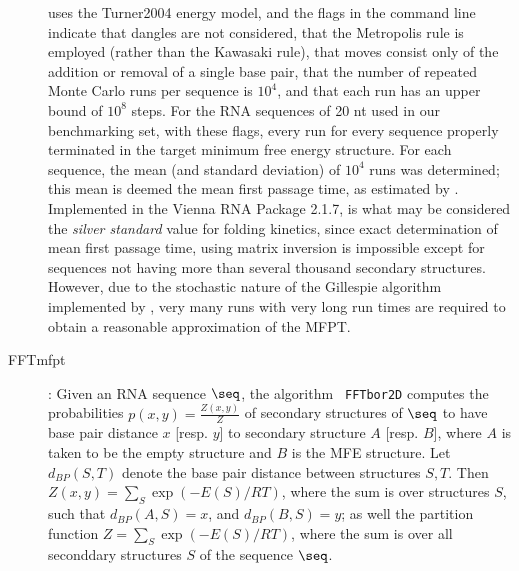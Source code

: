 \begin{description}
\begin{quote}
\end{quote}
 uses the Turner2004 energy model, and the flags in
the command line indicate that dangles are not considered, that the
Metropolis rule is employed (rather than the Kawasaki rule), that
moves consist only of the addition or removal of a single base pair,
that the number of repeated Monte Carlo runs per sequence is $10^4$,
and that each run has an upper bound of $10^8$ steps. For the RNA
sequences of 20 nt used in our benchmarking set, with these flags,
every run for every sequence properly terminated in the target minimum
free energy structure. For each sequence, the mean (and standard
deviation) of $10^4$ runs was determined; this mean is deemed the mean
first passage time, as estimated by \kinfold. Implemented in the
Vienna RNA Package 2.1.7, \kinfold is what may be considered the
{\em silver standard} value for folding kinetics, since exact
determination of mean first passage time, using matrix inversion is
impossible except for sequences not having more than several thousand
secondary structures. However, due to the stochastic nature of the
Gillespie algorithm implemented by \kinfold, very many runs with
very long run times are required to obtain a reasonable approximation
of the MFPT.

\item[FFTmfpt]: Given an RNA sequence $\seq$, the algorithm {\tt
FFTbor2D} \cite{Senter.jmb14} computes the probabilities $p(x,y) =
\frac{Z(x,y)}{Z}$ of secondary structures of $\seq$ to have base pair
distance $x$ [resp. $y$] to secondary structure $A$ [resp. $B$], where
$A$ is taken to be the empty structure and $B$ is the MFE structure.
Let $d_{BP}(S,T)$ denote the base pair distance between structures
$S,T$. Then $Z(x,y) = \sum_S \exp(-E(S)/RT)$, where the sum is over
structures $S$, such that $d_{BP}(A,S)=x$, and $d_{BP}(B,S)=y$; as
well the partition function $Z =\sum_S \exp(-E(S)/RT)$, where the sum
is over all seconddary structures $S$ of the sequence $\seq$.


\end{description}

